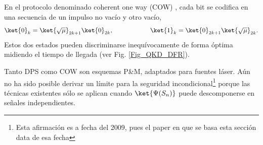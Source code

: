 \documentclass[a4paper,11pt]{book} %
\numberwithin{equation}{chapter}
\begin{document}
En el protocolo denominado coherent one way (COW) \cite{bib_Phase_gisin2004practical,bib_Phase_Stucki_2005}, cada bit se codifica en una secuencia de un impulso no vacío y otro vacío,
	\begin{equation}
	\ket{0}_k = \ket{\sqrt{\mu}}_{2k+1} \ket{0}_{2k}, \hspace{2cm} 
	\ket{1}_k = \ket{0}_{2k+1} \ket{\sqrt{\mu}}_{2k}.
	\end{equation}
Estos dos estados pueden discriminarse inequívocamente de forma óptima midiendo el tiempo de llegada (ver Fig. \ref{Fig_QKD_DFR}). 

Tanto DPS como COW son esquemas P\&M, adaptados para fuentes láser. Aún no ha sido posible derivar un límite para la seguridad incondicional\footnote{Esta afirmación es a fecha del 2009, pues el paper en que se basa esta sección \cite{bib_QKD_resumen} data de esa fecha} porque las técnicas existentes sólo se aplican cuando $\ket{\Psi (S_n)}$ puede descomponerse en señales independientes. 
		
	
	
		
	
		
		
	

	
\end{document}
